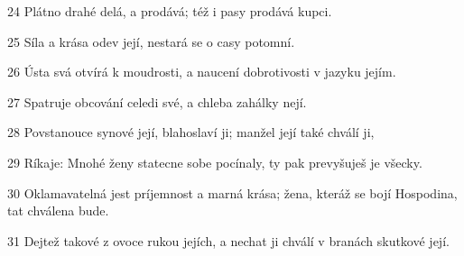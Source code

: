 \par 24 Plátno drahé delá, a prodává; též i pasy prodává kupci.
\par 25 Síla a krása odev její, nestará se o casy potomní.
\par 26 Ústa svá otvírá k moudrosti, a naucení dobrotivosti v jazyku jejím.
\par 27 Spatruje obcování celedi své, a chleba zahálky nejí.
\par 28 Povstanouce synové její, blahoslaví ji; manžel její také chválí ji,
\par 29 Ríkaje: Mnohé ženy statecne sobe pocínaly, ty pak prevyšuješ je všecky.
\par 30 Oklamavatelná jest príjemnost a marná krása; žena, kteráž se bojí Hospodina, tat chválena bude.
\par 31 Dejtež takové z ovoce rukou jejích, a nechat ji chválí v branách skutkové její.

